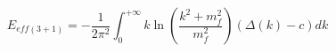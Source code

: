 \begin{equation}
 E_{eff(3+1)}=-\frac{1}{2\pi^{2}}\int_{0}^{+\infty}k\ln\left(\frac{k^{2}+m^{2}_{f}}{m_{f}^{2}}\right) (\Delta(k)-c) dk
\end{equation}

